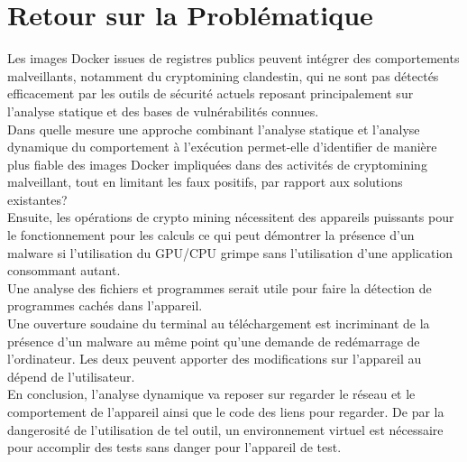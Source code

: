 \section{Retour sur la Problématique}
Les images Docker issues de registres publics peuvent intégrer des comportements malveillants, notamment du cryptomining clandestin, qui ne sont pas détectés efficacement par les outils de sécurité actuels reposant principalement sur l'analyse statique et des bases de vulnérabilités connues. \\
\newline
Dans quelle mesure une approche combinant l'analyse statique et l'analyse dynamique du comportement à l'exécution permet-elle d'identifier de manière plus fiable des images Docker impliquées dans des activités de cryptomining malveillant, tout en limitant les faux positifs, par rapport aux solutions existantes? \\
\newline
Ensuite, les opérations de crypto mining nécessitent des appareils puissants pour le fonctionnement pour les calculs ce qui peut démontrer la présence d'un malware si l'utilisation du GPU/CPU grimpe sans l'utilisation d'une application consommant autant. \\
\newline
Une analyse des fichiers et programmes serait utile pour faire la détection de programmes cachés dans l'appareil. \\
\newline
Une ouverture soudaine du terminal au téléchargement est incriminant de la présence d'un malware au même point qu'une demande de redémarrage de l'ordinateur. Les deux peuvent apporter des modifications sur l'appareil au dépend de l'utilisateur. \\
\newline
En conclusion, l'analyse dynamique va reposer sur regarder le réseau et le comportement de l'appareil ainsi que le code des liens pour regarder. De par la dangerosité de l'utilisation de tel outil, un environnement virtuel est nécessaire pour accomplir des tests sans danger pour l'appareil de test.
\newline
